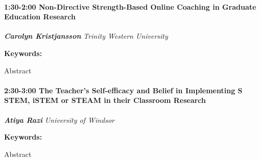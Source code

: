 \documentclass[
]{book}
\begin{document}
\begin{session}
\hypertarget{non-directive-strength-based-online-coaching-in-graduate-education-research}{%
\paragraph*{\texorpdfstring{1:30-2:00 \textbar{} \textbf{Non-Directive
Strength-Based Online Coaching in Graduate Education} \textbar{}
Research}{1:30-2:00 \textbar{} Non-Directive Strength-Based Online Coaching in Graduate Education \textbar{} Research}}\label{non-directive-strength-based-online-coaching-in-graduate-education-research}}

\textbf{\emph{Carolyn Kristjansson}} \textbar{} \emph{Trinity Western
University}

\textbf{Keywords:}

Abstract
\end{session}

\begin{session}
\hypertarget{the-teachers-self-efficacy-and-belief-in-implementing-s-stem-istem-or-steam-in-their-classroom-research}{%
\paragraph*{\texorpdfstring{2:30-3:00 \textbar{} \textbf{The Teacher's
Self-efficacy and Belief in Implementing S STEM, iSTEM or STEAM in their
Classroom} \textbar{}
Research}{2:30-3:00 \textbar{} The Teacher's Self-efficacy and Belief in Implementing S STEM, iSTEM or STEAM in their Classroom \textbar{} Research}}\label{the-teachers-self-efficacy-and-belief-in-implementing-s-stem-istem-or-steam-in-their-classroom-research}}

\textbf{\emph{Atiya Razi}} \textbar{} \emph{University of Windsor}

\textbf{Keywords:}

Abstract
\end{session}
\end{document}
